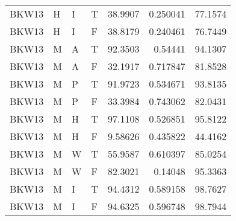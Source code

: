 \begin{table}[htb!]
{\begin{tabular}{llllrrr}
            BKW13    & H     & I     & T          & 38.9907    & 0.250041  & 77.1574  \\
            BKW13    & H     & I     & F          & 38.8179    & 0.240461  & 76.7449  \\
            BKW13    & M     & A     & T          & 92.3503    & 0.54441   & 94.1307  \\
            BKW13    & M     & A     & F          & 32.1917    & 0.717847  & 81.8528  \\
            BKW13    & M     & P     & T          & 91.9723    & 0.534671  & 93.8135  \\
            BKW13    & M     & P     & F          & 33.3984    & 0.743062  & 82.0431  \\
            BKW13    & M     & H     & T          & 97.1108    & 0.526851  & 95.8122  \\
            BKW13    & M     & H     & F          & 9.58626    & 0.435822  & 44.4162  \\
            BKW13    & M     & W     & T          & 55.9587    & 0.610397  & 85.0254  \\
            BKW13    & M     & W     & F          & 82.3021    & 0.14048   & 95.3363  \\
            BKW13    & M     & I     & T          & 94.4312    & 0.589158  & 98.7627  \\
            BKW13    & M     & I     & F          & 94.6325    & 0.596748  & 98.7944  \\
            \hline
        \end{tabular}
    }{
    }
\end{table} 
